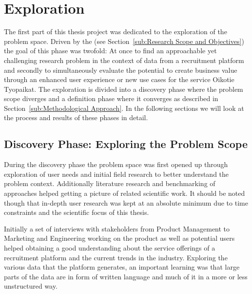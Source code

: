 
\clearpage

\section{Exploration}
\label{sec:Exploration}

The first part of this thesis project was dedicated to the exploration of the problem space. Driven by the  (see Section~\ref{sub:Research Scope and Objectives}) the goal of this phase was twofold: At once to find an approachable yet challenging research problem in the context of data from a recruitment platform and secondly to simultaneously evaluate the potential to create business value through an enhanced user experience or new use cases for the service \gls{Oikotie Tyopaikat}. The exploration is divided into a discovery phase where the problem scope diverges and a definition phase where it converges as described in Section~\ref{sub:Methodological Approach}. In the following sections we will look at the process and results of these phases in detail.

\subsection{Discovery Phase: Exploring the Problem Scope}
\label{Discovery Phase: Exploring the Problem Scope}

During the discovery phase the problem space was first opened up through exploration of user needs and initial field research to better understand the problem context. Additionally literature research and benchmarking of approaches helped getting a picture of related scientific work. It should be noted though that in-depth user research was kept at an absolute minimum due to time constraints and the scientific focus of this thesis.

Initially a set of interviews with stakeholders from Product Management to Marketing and Engineering working on the product as well as potential users helped obtaining a good understanding about the service offerings of a recruitment platform and the current trends in the industry. Exploring the various data that the platform generates, an important learning was that large parts of the data are in form of written language and much of it in a more or less unstructured way.

